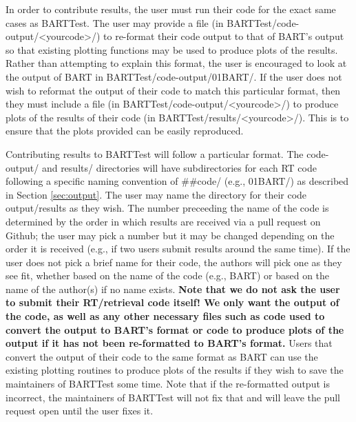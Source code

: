 \documentclass[letterpaper, 12pt]{article}
\begin{document}
In order to contribute results, the user must run their code for the exact 
same cases as BARTTest. The user may provide a file 
(in BARTTest/code-output/{\textless}yourcode{\textgreater}/) to re-format 
their code output to that of BART's output so that existing plotting functions 
may be used to produce plots of the results. Rather than attempting 
to explain this format, the user is encouraged to look at the output of BART 
in BARTTest/code-output/01BART/. If the user does not wish to reformat the 
output of their code to match this particular format, then they must include a 
file (in BARTTest/code-output/{\textless}yourcode{\textgreater}/) to produce 
plots of the results of their code 
(in BARTTest/results/{\textless}yourcode{\textgreater}/). 
This is to ensure that the plots provided can be easily reproduced.

Contributing results to BARTTest will follow a particular format. The 
code-output/ and results/ directories will have subdirectories for each RT 
code following a specific naming convention of {\#}{\#}code/ (e.g., 01BART/) as 
described in Section \ref{sec:output}. The user may name the directory for 
their code output/results as they wish. The number 
preceeding the name of the code is determined by the order 
in which results are received via a pull request on Github; the user may pick 
a number but it may be changed depending on the order it is received (e.g., if 
two users submit results around the same time). If the user does not pick 
a brief name for their code, the authors will pick one as they see fit, 
whether based on the name of the code (e.g., BART) or based on the name of 
the author(s) if no name exists. \textbf{Note that we do not ask the user 
to submit their RT/retrieval code itself! We only want the output of the code, as well as any other 
necessary files such as code used to convert the output to BART's format or 
code to produce plots of the output if it has not been re-formatted to 
BART's format.} Users that convert the output of their code to the same format 
as BART can use the existing plotting routines to produce plots of the 
results if they wish to save the maintainers of BARTTest some time. Note that 
if the re-formatted output is incorrect, the maintainers of BARTTest will not 
fix that and will leave the pull request open until the user fixes it.
\end{document}
